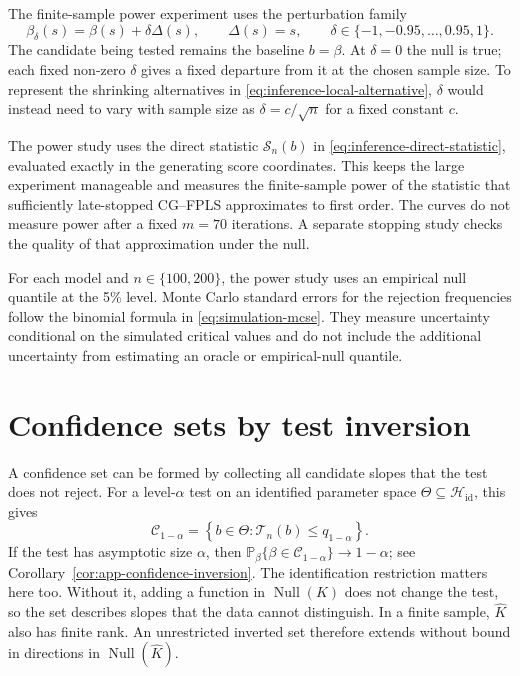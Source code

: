 The finite-sample power experiment uses the perturbation family
\begin{equation}
    \beta_\delta(s)=\beta(s)+\delta\Delta(s),
    \qquad
    \Delta(s)=s,
    \qquad
    \delta\in\{-1,-0.95,\ldots,0.95,1\}.
    \label{eq:inference-power-family}
\end{equation}
The candidate being tested remains the baseline $b=\beta$.  At $\delta=0$
the null is true; each fixed non-zero $\delta$ gives a fixed departure from
it at the chosen sample size.  To represent the shrinking alternatives in
\eqref{eq:inference-local-alternative}, $\delta$ would instead need to vary
with sample size as $\delta= c/\sqrt n$ for a fixed constant $c$.

The power study uses the direct statistic $\mathcal S_n(b)$ in
\eqref{eq:inference-direct-statistic}, evaluated exactly in the generating
score coordinates.  This keeps the large experiment manageable and measures
the finite-sample power of the statistic that sufficiently late-stopped
CG--FPLS approximates to first order.  The curves do not measure power after
a fixed $m=70$ iterations.  A separate stopping study checks the quality of
that approximation under the null.

For each model and $n\in\{100,200\}$, the power study uses an empirical null
quantile at the 5\% level.  Monte Carlo standard errors for the rejection
frequencies follow the binomial formula in \eqref{eq:simulation-mcse}.
They measure uncertainty conditional on the simulated critical values and
do not include the additional uncertainty from estimating an oracle or
empirical-null quantile.

\section{Confidence sets by test inversion}
\label{sec:inference-confidence}

A confidence set can be formed by collecting all candidate slopes that the
test does not reject.  For a level-$\alpha$ test on an identified parameter
space $\Theta\subseteq\mathcal H_{\mathrm{id}}$, this gives
\begin{equation}
    \mathcal C_{1-\alpha}
    =\left\{b\in\Theta:
      \mathcal T_n(b)\leq q_{1-\alpha}\right\}.
    \label{eq:inference-confidence-set}
\end{equation}
If the test has asymptotic size $\alpha$, then
$\mathbb P_\beta\{\beta\in\mathcal C_{1-\alpha}\}\to1-\alpha$; see
Corollary~\ref{cor:app-confidence-inversion}.  The identification restriction
matters here too.  Without it, adding a function in $\operatorname{Null}(K)$
does not change the test, so the set describes slopes that the data cannot
distinguish.  In a finite sample, $\widehat K$ also has finite rank.  An
unrestricted inverted set therefore extends without bound in directions in
$\operatorname{Null}(\widehat K)$.

